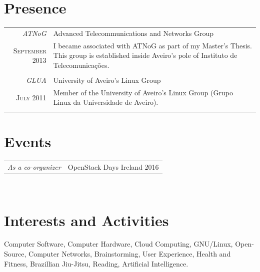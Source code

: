 \documentclass[letter,10pt]{article} %
\begin{document}
%

\section{Presence}
\begin{tabular}{r|p{11cm}}
    \emph{ATNoG} & Advanced Telecommunications and Networks Group \\
    \textsc{September 2013} & \footnotesize{I became associated with ATNoG as part of my Master's Thesis. This group is established inside Aveiro's pole of Instituto de Telecomunicações.}\\
    \multicolumn{2}{c}{} \\
    \emph{GLUA} & University of Aveiro's Linux Group \\
    \textsc{July 2011} & \footnotesize{Member of the University of Aveiro's Linux Group (Grupo Linux da Universidade de Aveiro).}\\
    \multicolumn{2}{c}{}\\
\end{tabular}


\section{Events}
\begin{tabular}{r|p{11cm}}
    \emph{As a co-organizer} & OpenStack Days Ireland 2016 \\
\end{tabular} \\


\section{Interests and Activities}
Computer Software, 
Computer Hardware, 
Cloud Computing, 
GNU/Linux, 
Open-Source, 
Computer Networks, 
Brainstorming, 
User Experience, 
Health and Fitness, 
Brazillian Jiu-Jitsu, 
Reading, 
Artificial Intelligence.
\end{document}

